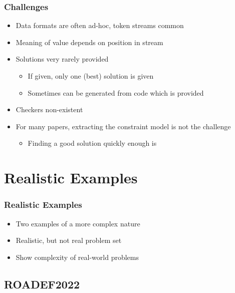 \documentclass[dvipsnames,aspectratio=169]{beamer}
\begin{document}
\begin{frame}
\frametitle{Challenges}
\begin{itemize}
\item Data formats are often ad-hoc, token streams common
\item Meaning of value depends on position in stream
\item Solutions very rarely provided
\begin{itemize}
\item If given, only one (best) solution is given
\item Sometimes can be generated from code which is provided
\end{itemize}
\item Checkers non-existent
\item For many papers, extracting the constraint model is not the challenge
\begin{itemize}
\item Finding a good solution quickly enough is
\end{itemize} 
\end{itemize}
\end{frame}



\section{Realistic Examples}

\begin{frame}
\frametitle{Realistic Examples}
\begin{itemize}
\item Two examples of a more complex nature
\item Realistic, but not real problem set
\item Show complexity of real-world problems 
\end{itemize}
\end{frame}


\subsection{ROADEF2022}
\end{document}
